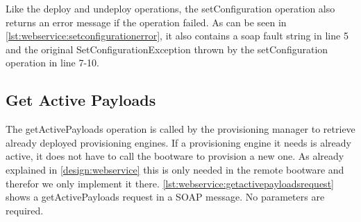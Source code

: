\vspace*{\baselineskip}

Like the deploy and undeploy operations, the setConfiguration operation also returns an error message if the operation failed.
As can be seen in \autoref{lst:webservice:setconfigurationerror}, it also contains a soap fault string in line 5 and the original SetConfigurationException thrown by the setConfiguration operation in line 7-10.

\vspace*{\baselineskip}

\subsection{Get Active Payloads}

The getActivePayloads operation is called by the provisioning manager to retrieve already deployed provisioning engines.
If a provisioning engine it needs is already active, it does not have to call the bootware to provision a new one.
As already explained in \autoref{design:webservice} this is only needed in the remote bootware and therefor we only implement it there.
\autoref{lst:webservice:getactivepayloadsrequest} shows a getActivePayloads request in a SOAP message.
No parameters are required.

\vspace*{\baselineskip}

